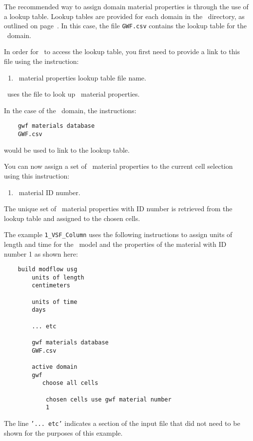 {The recommended way to assign domain material properties is through the use of a lookup table. 
\label{page:LookupTable} 
\label{page:LookupTable}
Lookup tables are provided for each domain in the \bin\ directory, as outlined on page~\pageref{page:userbin}. In this case, the file \texttt{GWF.csv} contains the lookup table for the \gwf\ domain.

In order for \mut\ to access the lookup table, you first need to provide a link to this file using the instruction:

    {
        \squish
        \begin{enumerate}
        \item {}  \gwf\ material properties lookup table file name.
        \end{enumerate}
          \mut\ uses the file  to look up \gwf\ material properties.
    }

In the case of the \gwf\ domain, the instructions:
\begin{verbatim}
    gwf materials database
    GWF.csv
\end{verbatim}
would be used to link to the lookup table.

You can now assign a set of \gwf\ material properties to the current cell selection using this instruction:  

    {
        \squish
        \begin{enumerate}
        \item {}  \gwf\ material ID number.
        \end{enumerate}
          The unique set of \gwf\ material properties with ID number  is retrieved from the lookup table and assigned to the chosen cells.
    }

The example \texttt{1\_VSF\_Column} uses the following instructions to assign units of length and time for the \mfus\ model and the properties of the material with ID number 1 as shown here:
\begin{verbatim}
    build modflow usg
        units of length
        centimeters

        units of time
        days

        ... etc

        gwf materials database
        GWF.csv

        active domain
        gwf
           choose all cells

            chosen cells use gwf material number
            1
\end{verbatim}
The line \texttt{'...\ etc'} indicates a section of the input file that did not need to be shown for the purposes of this example.

}
